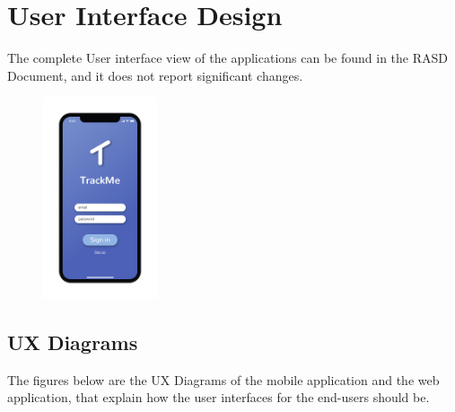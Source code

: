 \chapter{User Interface Design}
The complete User interface view of the applications can be found in the RASD Document, and it does not report significant changes.
\begin{figure}[H]
    \centering
   
\end{figure}
\begin{figure}[H]
    \centering
    \includegraphics[width=0.30\textwidth]{./Pictures/Mockup/mobile/login.png}
    
\end{figure}


\section{UX Diagrams}
The figures below are the UX Diagrams of the mobile application and the web application, that explain how the user interfaces for the end-users should be.


